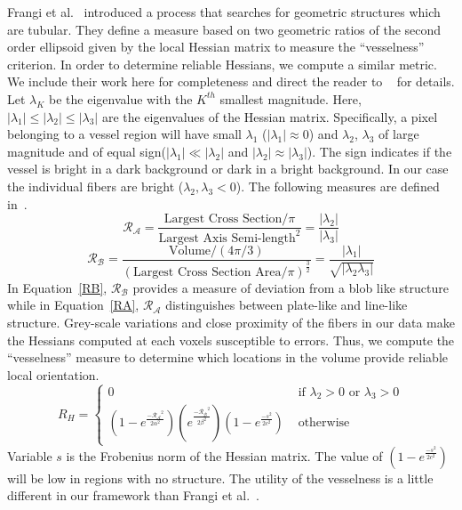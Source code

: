 Frangi et al.~\cite{Frangi1998} introduced a process that searches for geometric structures which are tubular. They define a measure based on two geometric ratios of the second order ellipsoid given by the local Hessian matrix to measure the ``vesselness'' criterion.  In order to determine reliable Hessians, we compute a similar metric. We include their work here for completeness and direct the reader to ~\cite{Frangi1998} for details. Let $\lambda_{K}$ be the eigenvalue with the $K^{th}$ smallest magnitude. Here, $|{\lambda}_{1}| \leq| {\lambda}_{2}|\leq| {\lambda}_{3}| $ are the eigenvalues of the Hessian matrix. Specifically, a pixel belonging to a vessel region will have small $\lambda_{1}$ ($|\lambda_{1}|\approx 0$) and $\lambda_{2}$, $\lambda_{3}$ of large magnitude and of equal sign($|\lambda_{1}| \ll |\lambda_{2}|$ and $|\lambda_{2}|\approx |\lambda_{3}|$). The sign indicates if the vessel is bright in a dark background or dark in a bright background. In our case the individual fibers are bright ($\lambda_2,\lambda_3 < 0$). The following measures are defined in~\cite{Frangi1998}.  
\begin{equation}\label{RA}
\mathcal{R_{A}}=\frac{\textrm{Largest  Cross Section}\big/ \pi}{{\textrm{Largest Axis Semi-length}}^{2}}=\frac{|\lambda_{2}|}{|\lambda_{3}|}
\end{equation}
\begin{equation}\label{RB}
\mathcal{R_{B}}=\frac{\textrm{Volume}\big/ (4\pi \big/ 3)}{{(\textrm{Largest Cross Section Area}\big/ \pi)}^{\frac{3}{2}}}=\frac{|\lambda_{1}|}{\sqrt{|\lambda_{2}\lambda_{3}|}}
\end{equation}
In Equation~\ref{RB}, $\mathcal{R_{B}}$ provides a measure of deviation from a blob like structure while in Equation~\ref{RA}, $\mathcal{R_{A}}$ distinguishes between plate-like and line-like structure. Grey-scale variations and close proximity of the fibers in our data make the Hessians computed at each voxels susceptible to errors. Thus, we compute the ``vesselness'' measure to determine which locations in the volume provide reliable local orientation.
$$
R_{H} = \left\{ \begin{array}{ccc}
 0 & \mbox{ if $\lambda_{2}>0$ or $\lambda_{3}>0$} \\
  (1-e^{\frac{\mathcal{-R_{A}}^{2}}{2\alpha^{2}}})
  (e^{\frac{\mathcal{-R_{B}}^{2}}{2\beta^{2}}}) (1-e^{\frac{-s^2}{2c^2}}) &\mbox{ otherwise}
       \end{array} \right.
$$
Variable $s$ is the Frobenius norm of the Hessian matrix. The value of $(1-e^{\frac{-s^2}{2c^2}})$ will be low in regions with no structure. The utility of the vesselness is a little different in our framework than Frangi et al.~\cite{Frangi1998}.
